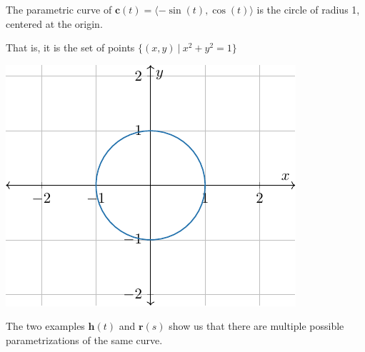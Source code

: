 \begin{example}
The parametric curve of $\bm{c}(t) = \langle  -\sin(t), \cos(t) \rangle$ is the circle of radius 1, centered at the origin.

That is, it is the set of points $\{(x,y) \ | \ x^2 + y^2=1 \}$

 \begin{center}        
        \includegraphics{chapters/2-RealAnalysis/figures/figures-parametriccircle.pdf}
    \end{center}

\end{example}


\begin{remark}
The two examples \hyperref[helix1]{$\bm{h}(t)$} and \hyperref[helix2]{$\bm{r}(s)$} show us that there are multiple possible parametrizations of the same curve.


\end{remark}


